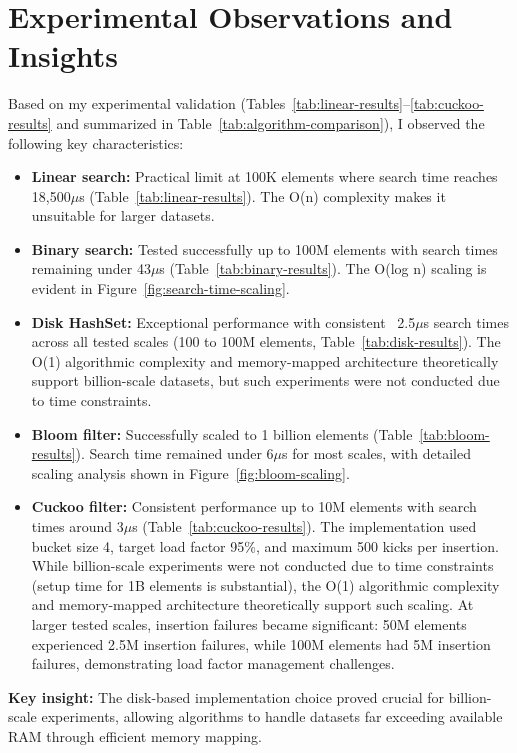 \documentclass[sigconf]{acmart}
\begin{document}
\section{Experimental Observations and Insights}
Based on my experimental validation (Tables~\ref{tab:linear-results}--\ref{tab:cuckoo-results} and summarized in Table~\ref{tab:algorithm-comparison}), I observed the following key characteristics:
\begin{itemize}
\item \textbf{Linear search:} Practical limit at 100K elements where search time reaches 18,500$\mu$s (Table~\ref{tab:linear-results}). The O(n) complexity makes it unsuitable for larger datasets.
\item \textbf{Binary search:} Tested successfully up to 100M elements with search times remaining under 43$\mu$s (Table~\ref{tab:binary-results}). The O(log n) scaling is evident in Figure~\ref{fig:search-time-scaling}.
\item \textbf{Disk HashSet:} Exceptional performance with consistent ~2.5$\mu$s search times across all tested scales (100 to 100M elements, Table~\ref{tab:disk-results}). The O(1) algorithmic complexity and memory-mapped architecture theoretically support billion-scale datasets, but such experiments were not conducted due to time constraints.
\item \textbf{Bloom filter:} Successfully scaled to 1 billion elements (Table~\ref{tab:bloom-results}). Search time remained under 6$\mu$s for most scales, with detailed scaling analysis shown in Figure~\ref{fig:bloom-scaling}.
\item \textbf{Cuckoo filter:} Consistent performance up to 10M elements with search times around 3$\mu$s (Table~\ref{tab:cuckoo-results}). The implementation used bucket size 4, target load factor 95\%, and maximum 500 kicks per insertion. While billion-scale experiments were not conducted due to time constraints (setup time for 1B elements is substantial), the O(1) algorithmic complexity and memory-mapped architecture theoretically support such scaling. At larger tested scales, insertion failures became significant: 50M elements experienced 2.5M insertion failures, while 100M elements had 5M insertion failures, demonstrating load factor management challenges.
\end{itemize}
\textbf{Key insight:} The disk-based implementation choice proved crucial for billion-scale experiments, allowing algorithms to handle datasets far exceeding available RAM through efficient memory mapping.
\end{document}
